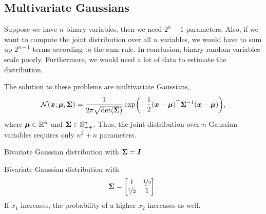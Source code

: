 \subsection{Multivariate Gaussians}

Suppose we have $n$ binary variables, then we need $2^n-1$
parameters. Also,
if we want to compute the joint distribution over all $n$
variables, we would have to sum up $2^{n-1}$ terms
according to the sum rule. In conclusion, binary random variables scale poorly.
Furthermore, we would need a lot of data to estimate the distribution.

The solution to these problems are multivariate Gaussians, \[
  \mathcal{N}(\vec{x};\vec{\mu},\mat{\Sigma}) =
\frac{1}{2\pi\sqrt{\det{\mat{\Sigma}}}}\exp\lft( -\frac{1}{2}
\transpose{(\vec{x}-\vec{\mu})}\inv{\mat{\Sigma}}(\vec{x}-\vec{\mu}) \rgt)
,\]
where $\bm{\mu}\in\mathbb{R}^n$ and
$\bm{\Sigma}\in\mathbb{S}_{++}^n$. Thus, the joint distribution over $n$ Gaussian
variables requires only $n^2+n$ parameters.

\begin{marginfigure}
  \centering
  \caption{Bivariate Gaussian distribution with $\bm{\Sigma}=\bm{I}$.}
\end{marginfigure}

\begin{marginfigure}[0.5cm]
  \centering
  \caption{Bivariate Gaussian distribution with \[
      \bm{\Sigma}=\begin{bmatrix}1 & \nicefrac{1}{2} \\ \nicefrac{1}{2} & 1\end{bmatrix}
    .\]
    If $x_1$ increases, the probability of a higher $x_2$ increases as well.}
\end{marginfigure}

